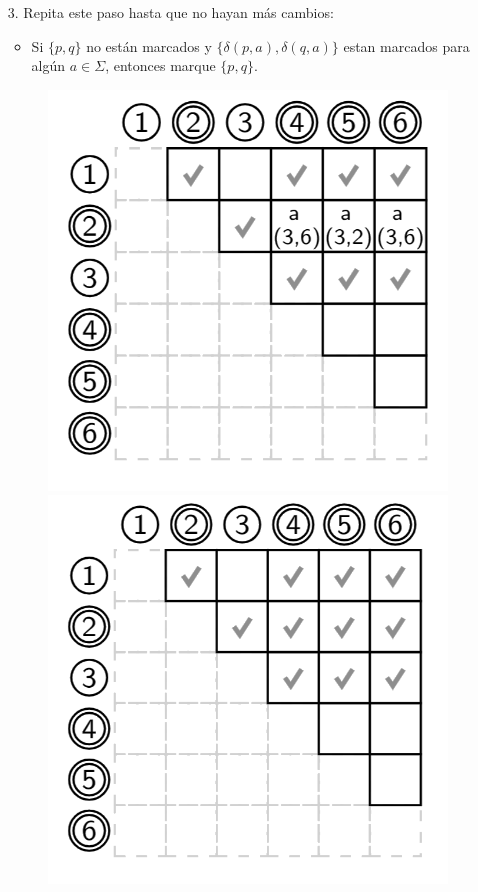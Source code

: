 \begin{enumerate}
    \item[3.] Repita este paso hasta que no hayan más cambios:
        \begin{itemize}
            \item Si $\{p,q\}$ no están marcados y $\{\delta(p,a), \delta(q,a)\}$ estan marcados para algún $a \in \Sigma$, entonces marque $\{p,q\}$.
        \end{itemize}
        \begin{figure}[H]
            \centering
            \includegraphics[scale=0.175]{img/cap2/amin4.png}
            \includegraphics[scale=0.175]{img/cap2/amin5.png}

\end{figure}
\end{enumerate}
